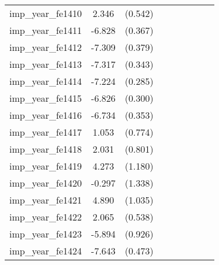 {\begin{tabular}{l*{4}{cc}}
imp\_year\_fe1410&    2.346\sym{***}&  (0.542)&                  &         &                  &         &                  &         \\
imp\_year\_fe1411&   -6.828\sym{***}&  (0.367)&                  &         &                  &         &                  &         \\
imp\_year\_fe1412&   -7.309\sym{***}&  (0.379)&                  &         &                  &         &                  &         \\
imp\_year\_fe1413&   -7.317\sym{***}&  (0.343)&                  &         &                  &         &                  &         \\
imp\_year\_fe1414&   -7.224\sym{***}&  (0.285)&                  &         &                  &         &                  &         \\
imp\_year\_fe1415&   -6.826\sym{***}&  (0.300)&                  &         &                  &         &                  &         \\
imp\_year\_fe1416&   -6.734\sym{***}&  (0.353)&                  &         &                  &         &                  &         \\
imp\_year\_fe1417&    1.053         &  (0.774)&                  &         &                  &         &                  &         \\
imp\_year\_fe1418&    2.031\sym{*}  &  (0.801)&                  &         &                  &         &                  &         \\
imp\_year\_fe1419&    4.273\sym{***}&  (1.180)&                  &         &                  &         &                  &         \\
imp\_year\_fe1420&   -0.297         &  (1.338)&                  &         &                  &         &                  &         \\
imp\_year\_fe1421&    4.890\sym{***}&  (1.035)&                  &         &                  &         &                  &         \\
imp\_year\_fe1422&    2.065\sym{***}&  (0.538)&                  &         &                  &         &                  &         \\
imp\_year\_fe1423&   -5.894\sym{***}&  (0.926)&                  &         &                  &         &                  &         \\
imp\_year\_fe1424&   -7.643\sym{***}&  (0.473)&                  &         &                  &         &                  &         \\

\end{tabular}}
